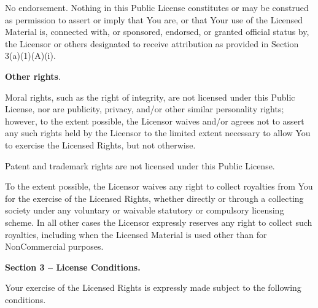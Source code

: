 \begin{doclicense@enumerate}
\begin{doclicense@enumerate}
\item No endorsement. Nothing in this Public License constitutes or may be construed as permission to assert or imply that You are, or that Your use of the Licensed Material is, connected with, or sponsored, endorsed, or granted official status by, the Licensor or others designated to receive attribution as provided in Section 3(a)(1)(A)(i).
\end{doclicense@enumerate}
\item \par \textbf{Other rights}.
\begin{doclicense@enumerate}
\item Moral rights, such as the right of integrity, are not licensed under this Public License, nor are publicity, privacy, and/or other similar personality rights; however, to the extent possible, the Licensor waives and/or agrees not to assert any such rights held by the Licensor to the limited extent necessary to allow You to exercise the Licensed Rights, but not otherwise.
\item Patent and trademark rights are not licensed under this Public License.
\item To the extent possible, the Licensor waives any right to collect royalties from You for the exercise of the Licensed Rights, whether directly or through a collecting society under any voluntary or waivable statutory or compulsory licensing scheme. In all other cases the Licensor expressly reserves any right to collect such royalties, including when the Licensed Material is used other than for NonCommercial purposes.
\end{doclicense@enumerate}

\end{doclicense@enumerate}
\par \textbf{Section 3 – License Conditions.}
\par Your exercise of the Licensed Rights is expressly made subject to the following conditions.
